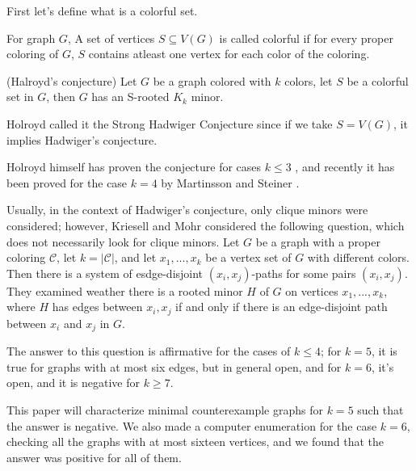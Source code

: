 First let's define what is a colorful set.

\begin{defn}
    For graph $G$, A set of vertices $S \subseteq V(G)$ is called colorful if for every proper coloring of $G$, $S$ contains atleast one 
    vertex for each color of the coloring.
\end{defn}

\begin{conj} (Halroyd's conjecture)
    Let $G$ be a graph colored with $k$ colors, let $S$ be a colorful set in $G$, then $G$ has an S-rooted $K_k$ minor. 
\end{conj}

Holroyd called it the Strong Hadwiger Conjecture since if we take $S = V(G)$, it implies Hadwiger's conjecture.

Holroyd himself has proven the conjecture for cases $k \leq 3$ \cite{Holroyd1997}, and recently it has been proved for the case
$k = 4$ by Martinsson and Steiner \cite{MARTINSSON20241}.


Usually, in the context of Hadwiger's conjecture, only clique minors were considered; however, Kriesell and Mohr \cite{matthias_2022} considered
the following question, which does not necessarily look for clique minors. Let $G$ be a graph with a proper coloring
$\mathcal{C}$, let $k = |\mathcal{C}|$, and let $x_1, ..., x_{k}$ be a vertex set of $G$ with different colors.
Then there is a system of esdge-disjoint $(x_i, x_j)$-paths for some pairs $(x_i, x_j)$.
They examined weather there is a rooted minor $H$ of $G$ on vertices $x_1, ..., x_{k}$, where $H$ has edges between 
$x_i, x_j$ if and only if there is an edge-disjoint path between $x_i$ and $x_j$ in $G$.

The answer to this question is affirmative for the cases of $k \leq 4$; for $k = 5$, it is true for graphs
with at most six edges, but in general open, and for $k = 6$, it's open, and it is negative for $k \geq 7$.

This paper will characterize minimal counterexample graphs for $k = 5$ such that the answer is negative. 
We also made a computer enumeration for the case $k = 6$, checking all the graphs with at most sixteen vertices, and 
we found that the answer was positive for all of them.

